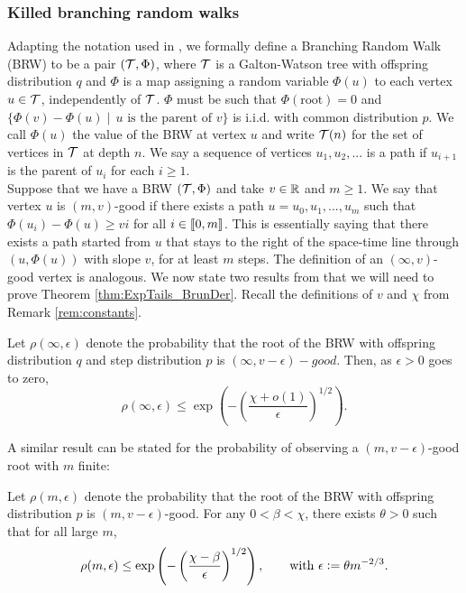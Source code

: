 \subsubsection{Killed branching random walks}
Adapting the notation used in \cite{exp_tails}, we formally define a Branching Random Walk (BRW) to be a pair $(\cal{T}, \Phi)$, where $\cal{T}$ is a Galton-Watson tree with offspring distribution $q$ and $\Phi$ is a map assigning a random variable $\Phi(u)$ to each vertex $u \in \cal{T}$, independently of $\cal{T}$. $\Phi$ must be such that  $\Phi(\text{root}) = 0$ and $\{\Phi(v) - \Phi(u) \mid\, \text{$u$ is the parent of $v$}\}$ is i.i.d. with common distribution $p$. We call $\Phi(u)$ the value of the BRW at vertex $u$ and write $\cal{T}(n)$ for the set of vertices in $\cal{T}$ at depth $n$. We say a sequence of vertices $u_1, u_2, ...$ is a path if $u_{i+1}$ is the parent of $u_i$ for each $i \geq 1$. \\
Suppose that we have a BRW $(\cal{T}, \Phi)$ and take $v \in \R$ and $m \geq 1$. We say that vertex $u$ is $(m, v)$-good if there exists a path $u = u_0, u_1, ..., u_m$ such that $\Phi(u_i) - \Phi(u) \geq vi$ for all $i \in \bbracket{0,m}$. This is essentially saying that there exists a path started from $u$ that stays to the right of the space-time line through $(u, \Phi(u))$ with slope $v$, for at least $m$ steps. The definition of an $(\infty, v)$-good vertex is analogous. We now state two results from \cite{gantert2008asymptotics} that we will need to prove Theorem \ref{thm:ExpTails_BrunDer}. Recall the definitions of $v$ and $\chi$ from Remark \ref{rem:constants}. 

\begin{theorem}\label{thm:infty_good}
Let $\rho(\infty, \epsilon)$ denote the probability that the root of the BRW with offspring distribution $q$ and step distribution $p$ is $(\infty, v - \epsilon)-good$. Then, as $\epsilon > 0$ goes to zero, 
\begin{equation}
\rho(\infty, \epsilon) \leq \exp\left( - \left( \frac{\chi + o(1)}{\epsilon} \right)^{1/2} \right). 
\end{equation}
\end{theorem}

A similar result can be stated for the probability of observing a $(m, v - \epsilon)$-good root with $m$ finite:
\begin{theorem}\label{thm:finite_good}
Let $\rho(m, \epsilon)$ denote the probability that the root of the BRW with offspring distribution $p$ is $(m, v - \epsilon)$-good. For any $0 < \beta < \chi$, there exists $\theta > 0$ such that for all large $m$, 
\begin{equation*}
\rho(m, \epsilon) \leq \exp\left( - \left( \frac{\chi - \beta}{\epsilon} \right)^{1/2} \right), \qquad \text{with } \epsilon \defeq \theta m^{-2/3}. 
\end{equation*}
\end{theorem}

